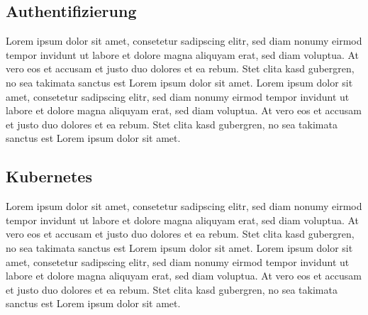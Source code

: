 \subsection{Authentifizierung}
Lorem ipsum dolor sit amet, consetetur sadipscing
elitr, sed diam nonumy eirmod tempor invidunt ut labore
et dolore magna aliquyam erat, sed diam voluptua. At vero eos et
accusam et justo duo dolores et ea rebum. Stet clita kasd gubergren, 
no sea takimata sanctus est Lorem ipsum dolor sit amet. Lorem ipsum dolor 
sit amet, consetetur sadipscing elitr, sed diam nonumy eirmod tempor 
invidunt ut labore et dolore magna aliquyam erat, sed diam voluptua. 
At vero eos et accusam et justo duo dolores et ea rebum. Stet clita kasd 
gubergren, no sea takimata sanctus est Lorem ipsum dolor sit amet.

\subsection{Kubernetes}
Lorem ipsum dolor sit amet, consetetur sadipscing
elitr, sed diam nonumy eirmod tempor invidunt ut labore
et dolore magna aliquyam erat, sed diam voluptua. At vero eos et
accusam et justo duo dolores et ea rebum. Stet clita kasd gubergren, 
no sea takimata sanctus est Lorem ipsum dolor sit amet. Lorem ipsum dolor 
sit amet, consetetur sadipscing elitr, sed diam nonumy eirmod tempor 
invidunt ut labore et dolore magna aliquyam erat, sed diam voluptua. 
At vero eos et accusam et justo duo dolores et ea rebum. Stet clita kasd 
gubergren, no sea takimata sanctus est Lorem ipsum dolor sit amet.

